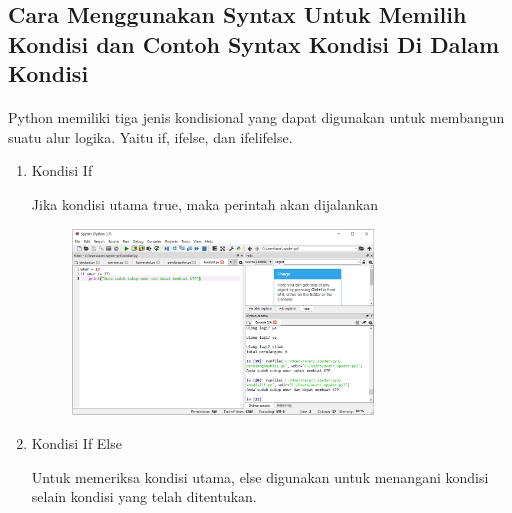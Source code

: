 \subsection{Cara Menggunakan Syntax Untuk Memilih Kondisi dan Contoh Syntax Kondisi Di Dalam Kondisi}
\paragraph{}
        Python memiliki tiga jenis kondisional yang dapat digunakan untuk membangun suatu alur logika. Yaitu if, ifelse, dan ifelifelse. 
\begin{enumerate}
    \item Kondisi If
    \par Jika kondisi utama true, maka perintah akan dijalankan
    \begin{figure}[h]
        \centerline{\includegraphics[width=8cm]{gambar/kondisiif.PNG}}
    \end{figure}
    \item Kondisi If Else
    \par Untuk memeriksa kondisi utama, else digunakan untuk menangani kondisi selain kondisi yang telah ditentukan.

\end{enumerate}
